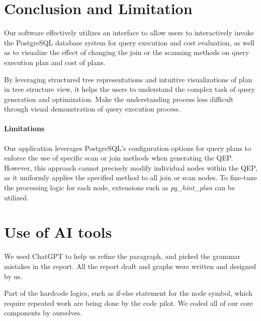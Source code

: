 \section{Conclusion and Limitation}
\label{sec:conclusion and limitation}

Our software effectively utilizes an interface to allow users to interactively invoke the PostgreSQL database system for query execution and cost evaluation, as well as to visualize the effect of changing the join or the scanning methods on query execution plan and cost of plans. 

By leveraging structured tree representations and intuitive visualizations of plan in tree structure view, it helps the users to understand the complex task of query generation and optimization. Make the understanding process less difficult through visual demonstration of query execution process.

\paragraph{Limitations} Our application leverages PostgreSQL's configuration options for query plans to enforce the use of specific scan or join methods when generating the QEP. However, this approach cannot precisely modify individual nodes within the QEP, as it uniformly applies the specified method to all join or scan nodes. To fine-tune the processing logic for each node, extensions such as \textit{pg\_hint\_plan} can be utilized.

\section{Use of AI tools}
We used ChatGPT to help us refine the paragraph, and picked the grammar mistakes in the report. All the report draft and graphs were written and designed by us.

Part of the hardcode logics, such as if-else statement for the node symbol, which require repeated work are being done by the code pilot. We coded all of our core components by ourselves.
